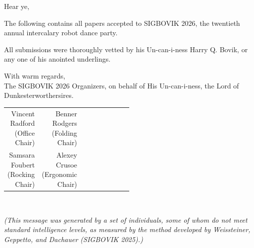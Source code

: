 \documentclass[12pt]{article}
\begin{document}
Hear ye,

The following contains all papers accepted to SIGBOVIK 2026, the twentieth annual intercalary robot dance party.

All submissions were thoroughly vetted by his Un-can-i-ness Harry Q. Bovik, or any one of his anointed underlings. 


\vspace{1em}


With warm regards, \\

\vspace{1em}
\textemdash{} The SIGBOVIK 2026 Organizers, on behalf of His Un-can-i-ness, the Lord of Dunkesterworthersires.
\vspace{1em}

\begin{tabular}{r r p{0.5\linewidth}}
	Vincent Radford (Office Chair) &
    Benner Rodgers (Folding Chair)\\
    Samsara Foubert (Rocking Chair) &
    Alexey Crusoe (Ergonomic Chair)\\

\end{tabular}

\\
\vspace{1em}

\emph{(This message was generated by a set of individuals, some of whom do not meet standard intelligence levels, as measured by the method developed by Weissteiner, Geppetto, and Dachauer (SIGBOVIK 2025).)}








\vfill

%
%
\thispagestyle{empty}
\end{document}
